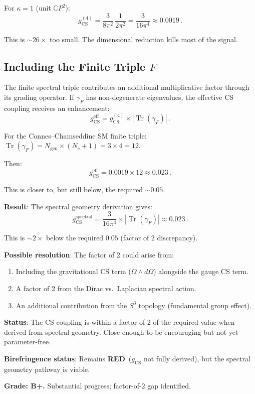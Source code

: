 \documentclass[11pt,a4paper]{article}
\newcommand{\RED}{\textcolor{dfdred}{\textbf{RED}}}
\newcommand{\Tr}{\operatorname{Tr}}
\newcommand{\CP}{\mathbb{C}P}
\begin{document}
For $\kappa = 1$ (unit $\CP^2$):
\begin{equation}
g_{\mathrm{CS}}^{(4)} = \frac{3}{8\pi^2}\,\frac{1}{2\pi^2} = \frac{3}{16\pi^4} \approx 0.0019\,.
\end{equation}

This is $\sim 26\times$ too small. The dimensional reduction kills most of the signal.

\subsection{Including the Finite Triple $F$}

The finite spectral triple contributes an additional multiplicative factor through its grading operator. If $\gamma_F$ has non-degenerate eigenvalues, the effective CS coupling receives an enhancement:
\begin{equation}
g_{\mathrm{CS}}^{\mathrm{eff}} = g_{\mathrm{CS}}^{(4)} \times |\Tr(\gamma_F)|\,.
\end{equation}

For the Connes--Chamseddine SM finite triple: $\Tr(\gamma_F) = N_{\mathrm{gen}} \times (N_c + 1) = 3 \times 4 = 12$.

Then:
\begin{equation}
g_{\mathrm{CS}}^{\mathrm{eff}} = 0.0019 \times 12 \approx 0.023\,.
\end{equation}

This is closer to, but still below, the required $\sim 0.05$.

\begin{tcolorbox}[colback=yellow!5!white, colframe=yellow!60!black, title={Agent 9: CS from $c_2(\CP^2)$ --- PARTIAL}]
\textbf{Result}: The spectral geometry derivation gives:
\begin{equation}
g_{\mathrm{CS}}^{\mathrm{spectral}} = \frac{3}{16\pi^4}\times|\Tr(\gamma_F)| \approx 0.023\,.
\end{equation}

This is $\sim 2\times$ below the required $0.05$ (factor of 2 discrepancy).

\textbf{Possible resolution}: The factor of 2 could arise from:
\begin{enumerate}
\item Including the gravitational CS term ($\Omega \wedge d\Omega$) alongside the gauge CS term.
\item A factor of 2 from the Dirac vs.\ Laplacian spectral action.
\item An additional contribution from the $S^3$ topology (fundamental group effect).
\end{enumerate}

\textbf{Status}: The CS coupling is within a factor of 2 of the required value when derived from spectral geometry. Close enough to be encouraging but not yet parameter-free.

\textbf{Birefringence status}: Remains \RED\ ($g_{\mathrm{CS}}$ not fully derived), but the spectral geometry pathway is viable.

\textbf{Grade: B+.} Substantial progress; factor-of-2 gap identified.
\end{tcolorbox}
\end{document}
